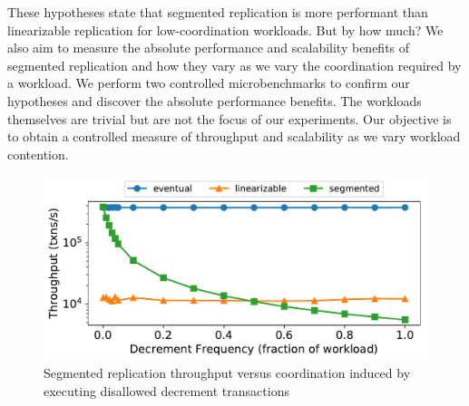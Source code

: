 These hypotheses state that segmented \invariantconfluent{} replication is more
performant than linearizable replication for low-coordination workloads. But by
how much?  We also aim to measure the absolute performance and scalability
benefits of segmented \invariantconfluent{} replication and how they vary as we
vary the coordination required by a workload. We perform two controlled
microbenchmarks to confirm our hypotheses and discover the absolute performance
benefits. The workloads themselves are trivial but are not the focus of our
experiments. Our objective is to obtain a controlled measure of throughput and
scalability as we vary workload contention.

\begin{figure}[t]
  \centering
  \includegraphics[width=\columnwidth]{figures/throughput_vs_fraction_16.pdf}
  \caption{%
    Segmented \invariantconfluent{} replication throughput versus coordination
    induced by executing disallowed decrement transactions
  }
\end{figure}

